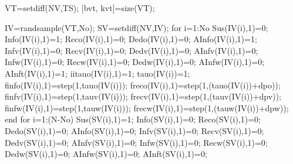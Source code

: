                 VT=setdiff(NV,TS);
                [bvt, kvt]=size(VT);
                              
                IV=randsample(VT,No);
                SV=setdiff(NV,IV);                                       
                for i=1:No
                    Sus(IV(i),1)=0;
                    Info(IV(i),1)=1;
                    Reco(IV(i),1)=0;
                    Dedo(IV(i),1)=0;
                    AInfo(IV(i),1)=1;
                    Infv(IV(i),1)=0;
                    Recv(IV(i),1)=0;
                    Dedv(IV(i),1)=0;
                    AInfv(IV(i),1)=0;
                    Infw(IV(i),1)=0;
                    Recw(IV(i),1)=0;
                    Dedw(IV(i),1)=0;
                    AInfw(IV(i),1)=0;
                    AInft(IV(i),1)=1;
                    iitauo(IV(i),1)=1; 
                    tauo(IV(i))=1;                     
                    finfo(IV(i),1)=step(1,tauo(IV(i))); %
                    freco(IV(i),1)=step(1,(tauo(IV(i))+dpo)); %
                    finfv(IV(i),1)=step(1,tauv(IV(i))); %
                    frecv(IV(i),1)=step(1,(tauv(IV(i))+dpv)); %
                    finfw(IV(i),1)=step(1,tauw(IV(i))); %
                    frecw(IV(i),1)=step(1,(tauw(IV(i))+dpw)); %
                end             
                for i=1:(N-No)
                    Sus(SV(i),1)=1;
                    Info(SV(i),1)=0;
                    Reco(SV(i),1)=0;
                    Dedo(SV(i),1)=0;
                    AInfo(SV(i),1)=0;
                    Infv(SV(i),1)=0;
                    Recv(SV(i),1)=0;
                    Dedv(SV(i),1)=0;
                    AInfv(SV(i),1)=0;
                    Infw(SV(i),1)=0;
                    Recw(SV(i),1)=0;
                    Dedw(SV(i),1)=0;
                    AInfw(SV(i),1)=0; 
                    AInft(SV(i),1)=0;                   

